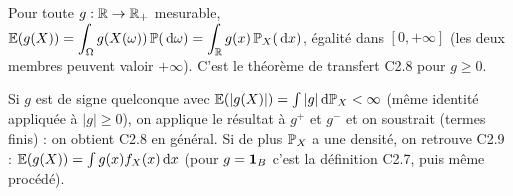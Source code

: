 \documentclass[11pt,a4paper]{article}
\begin{document}
\begin{exo}
\begin{resultat}
Pour toute $g:\mathbb{R}\to\mathbb{R}_+$ mesurable, $\displaystyle\mathbb{E}(g(X))=\int_\Omega g(X(\omega))\,\mathbb{P}(\,\mathrm{d}\omega)=\int_{\mathbb{R}} g(x)\,\mathbb{P}_X(\,\mathrm{d} x)$,
égalité dans $[0,+\infty]$ (les deux membres peuvent valoir $+\infty$). C'est le théorème de transfert C2.8 pour $g\ge0$.
\end{resultat}

\begin{remarque}
Si $g$ est de signe quelconque avec $\mathbb{E}(|g(X)|)=\int|g|\,\mathrm{d}\mathbb{P}_X<\infty$ (même identité appliquée à $|g|\ge0$), on applique le résultat à
$g^+$ et $g^-$ et on soustrait (termes finis) : on obtient C2.8 en général. Si de plus $\mathbb{P}_X$ a une densité, on retrouve C2.9 :
$\mathbb{E}(g(X))=\int g(x)f_X(x)\,\mathrm{d} x$ (pour $g=\mathbf{1}_B$ c'est la définition C2.7, puis même procédé).
\end{remarque}
\end{exo}
\end{document}
